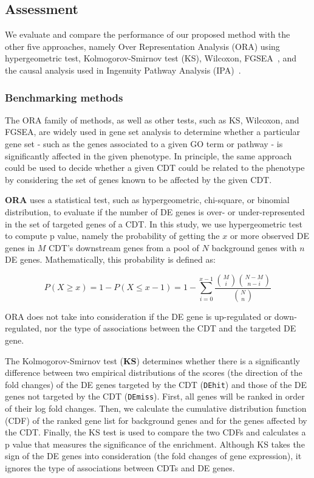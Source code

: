 \subsection{Assessment}

We evaluate and compare the performance of our proposed method with the other five approaches, namely Over Representation Analysis (ORA) using hypergeometric test, Kolmogorov-Smirnov test (KS)\cite{massey1951kolmogorov}, Wilcoxon\cite{wilcoxon1945individual}, FGSEA~\cite{korotkevich2021fast}, and the causal analysis used in Ingenuity Pathway Analysis (IPA)~\cite{kramer2013causal}.


\subsubsection{Benchmarking methods}

The ORA family of methods, as well as other tests, such as KS, Wilcoxon, and FGSEA, are widely used in gene set analysis to determine whether  a particular gene set - such as the genes associated to a given GO term or pathway - is significantly affected in the given phenotype. In principle, the same approach could be used to decide whether a given CDT could be related to the phenotype by considering the set of genes known to be affected by the given CDT. 

\textbf{ORA} uses a statistical test, such as hypergeometric, chi-square, or binomial distribution, to evaluate if the number of DE genes is over- or under-represented in the set of targeted genes of a CDT. In this study, we use hypergeometric test to compute p value, namely the probability of getting the $x$ or more observed DE genes in $M$ CDT's downstream genes from a pool of $N$ background genes with $n$ DE genes. Mathematically, this probability is defined as:

\begin{equation*}
P(X \geq x) = 1-P(X \leq x -1)= 1- \sum_{i=0}^{x-1} \frac{\binom{M}{i}\binom{N-M}{n-i}}{\binom{N}{n}} 
\end{equation*}

ORA does not take into consideration if the DE gene is up-regulated or down-regulated, nor the type of associations between the CDT and the targeted DE gene.

The Kolmogorov-Smirnov test (\textbf{KS}) determines whether there is a significantly difference between two empirical distributions of the scores (the direction of the fold changes) of the DE genes targeted by the CDT (\texttt{DEhit}) and those of the DE genes not targeted by the CDT (\texttt{DEmiss}). First, all genes will be ranked in order of their log fold changes. Then, we calculate the cumulative distribution function (CDF) of the ranked gene list for background genes and for the genes affected by the CDT. Finally, the KS test is used to compare the two CDFs and calculates a p value that measures the significance of the enrichment. Although KS takes the sign of the DE genes into consideration (the fold changes of gene expression), it ignores the type of associations between CDTs and DE genes.

